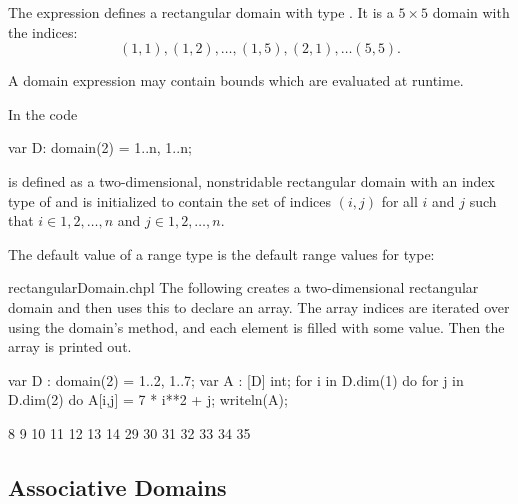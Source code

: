 \begin{example}
The expression  defines a rectangular domain with
type   .
It is a $5 \times 5$ domain with the indices:
\begin{equation}
(1, 1), (1, 2), \ldots, (1, 5), (2, 1), \ldots (5, 5).
\end{equation}
\end{example}

A domain expression may contain bounds which are evaluated at runtime.
\begin{example}
In the code
\begin{chapel}
var D: domain(2) = {1..n, 1..n};
\end{chapel}

 is defined as a two-dimensional, nonstridable rectangular
domain with an index type of  and is initialized to
contain the set of indices $(i,j)$ for all $i$ and $j$ such that
$i \in {1, 2, \ldots, n}$ and $j \in {1, 2, \ldots, n}$.
\end{example}


The default value of a range type is the  default range
values for type:
\begin{quote}
\end{quote}

\begin{chapelexample}{rectangularDomain.chpl}
The following creates a two-dimensional rectangular domain and then uses this to
declare an array.  The array indices are iterated over using the domain's
 method, and each element is filled with
some value.  Then the array is printed out.
\begin{chapel}
var D : domain(2) = {1..2, 1..7};
var A : [D] int;
for i in D.dim(1) do
  for j in D.dim(2) do
    A[i,j] = 7 * i**2 + j;
writeln(A);
\end{chapel}
\begin{chapelprintoutput}
8 9 10 11 12 13 14
29 30 31 32 33 34 35
\end{chapelprintoutput}
\end{chapelexample}

\subsection{Associative Domains}

